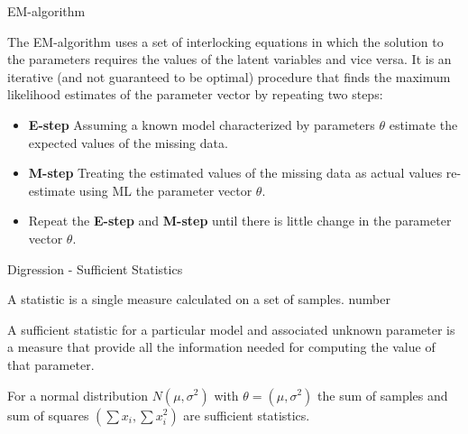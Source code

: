 \documentclass[12pt]{beamer}
\begin{document}
\begin{frame}{EM-algorithm}
\begin{definition} 

The EM-algorithm uses a set of interlocking equations in which the
solution to the parameters requires the values of the latent variables
and vice versa.  It is an iterative (and not guaranteed to be optimal)
procedure that finds the maximum likelihood estimates of the parameter
vector by repeating two steps:
\begin{itemize} 
\item{\bf E-step} Assuming a known model characterized by parameters $\theta$ estimate 
the expected values of the missing data. 
\item{\bf M-step} Treating the estimated values of the missing data as actual values 
re-estimate using ML the parameter vector $\theta$. 
\item{Repeat the {\bf E-step} and {\bf M-step} until there is little change in the 
parameter vector $\theta$. }
\end{itemize} 
\end{definition} 

\end{frame} 

\begin{frame}{Digression - Sufficient Statistics} 

\begin{definition} 
A statistic is a single measure calculated on a set of samples. number 
\end{definition} 


\begin{definition} 
A sufficient statistic for a particular model and associated unknown
parameter is a measure that provide all the information needed for
computing the value of that parameter.
\end{definition} 

\begin{example} 
For a normal distribution $N(\mu, \sigma^2)$ with $\theta = (\mu, \sigma^2)$ the sum of samples and sum of squares $(\sum  x_i, \sum x_i^2)$ are sufficient statistics. 
\end{example} 



\end{frame} 
\end{document}
